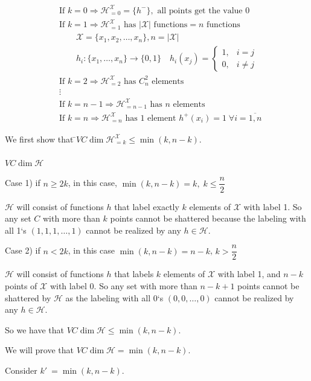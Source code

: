 \documentclass{article}
\newcommand{\<}{\langle}
\renewcommand{\>}{\rangle}
\theoremstyle{definition}
\def\gH{{\mathcal{H}}}
\def\gX{{\mathcal{X}}}
\newcommand{\vcd}[1]{VC \dim{#1}}
\newcommand{\szo}{\{0, 1\}}
\newcommand{\hkx}[1]{\gH_{=#1}^{\gX}}
\newcommand{\vcd}[1]{\text{VCdim}(#1)}
\newcommand{\szo}{\{0, 1\}}
\newcommand{\col}{\colon}
\newcommand{\ra}{\rightarrow}
\begin{document}
\begin{align*}
 &\text{If } k = 0 \Rightarrow \hkx{0} = \{h^-\}, \text{ all points get the value } 0 \\
 &\text{If } k = 1 \Rightarrow \hkx{1} \text{ has } |\gX| 
\text{ functions} = n \text{ functions} \\
& \qquad\gX = \{x_1, x_2, \dots, x_n\}, n = |\gX| \\
&\qquad h_i \col \{x_1, \dots, x_n\} \ra \szo \quad
h_i(x_j) = \begin{cases}
  1, & i = j \\
  0, & i \neq j
\end{cases} \\
 &\text{If } k = 2 \Rightarrow \hkx{2} \text{ has } C_n^2 \text{ elements} \\
 &\vdots \\
 &\text{If } k = n-1 \Rightarrow \hkx{n-1} \text { has } n \text{ elements} \\
 &\text{If } k = n \Rightarrow \hkx{n} \text{ has } 1 \text{ element } h^+(x_i) = 1 \; \forall i = \overline{1, n}
\end{align*}

\begin{tabbing}
We first show that \=$\vcd{\hkx{k}} \leq \min(k, n-k)$. \\
\>\qquad{} \\
\>$\vcd{\gH}$
\end{tabbing}

Case 1) if $n \geq 2k$, in this case, $\min(k, n-k) = k, \; k \leq \dfrac{n}{2}$

$\gH$ will consist of functions $h$ that label exactly $k$ elements of $\gX$ with label 1. So any set $C$ with more than $k$ points cannot be shattered because the labeling with all 1`s $(1, 1, 1, \dots, 1)$ cannot be realized by any $h \in \gH$.

Case 2) if $n < 2k$, in this case $\min(k, n-k) = n-k$, $k > \dfrac{n}{2}$

$\gH$ will consist of functions $h$ that labels $k$ elements of $\gX$ with label 1, and $n-k$ points of $\gX$ with label 0. So any set with more than $n-k+1$ points cannot be shattered by $\gH$ as the labeling with all 0`s $(0, 0, \dots, 0)$ cannot be realized by any $h \in \gH$.

So we have that $\vcd{\gH} \leq \min(k, n-k)$.

We will prove that $\vcd{\gH} = \min(k, n-k)$.

Consider $k'\ = \min(k, n-k)$.
\end{document}
